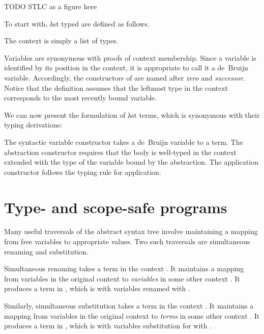 \documentclass[bsc,frontabs,oneside,singlespacing,parskip,deptreport]{infthesis}
\theoremstyle{definition}
\theoremstyle{lemma}
\begin{document}
TODO STLC as a figure here

To start with, λst typed are defined as follows.


The context is simply a list of types.


Variables are synonymous with proofs of context membership. Since a
variable is identified by its position in the context, it is
appropriate to call it a de~Bruijn variable. Accordingly, the
constructors of  are named after \textit{zero} and
\textit{successor}. Notice that the definition assumes that the
leftmost type in the context corresponds to the most recently bound
variable.


We can now present the formulation of λst terms, which is synonymous
with their typing derivations:


The syntactic variable  constructor takes a de~Bruijn variable to
a term. The abstraction constructor  requires that the body is
well-typed in the context  extended with the type  of the
variable bound by the abstraction. The application constructor
 follows the typing rule for application.


\section{Type- and scope-safe programs}
\label{sec:typ-scop-saf-prog}

Many useful traversals of the abstract syntax tree involve maintaining
a mapping from free variables to appropriate values. Two such
traversals are simultaneous renaming and substitution.

Simultaneous renaming takes a term  in the context . It maintains
a mapping  from variables in the original context  to
\textit{variables} in some other context . It produces a term in
, which is  with variables renamed with .

Similarly, simultaneous substitution takes a term  in the context
. It maintains a mapping  from variables in the original context
 to \textit{terms} in some other context . It produces a
term in , which is  with variables substitution for with .
\end{document}
